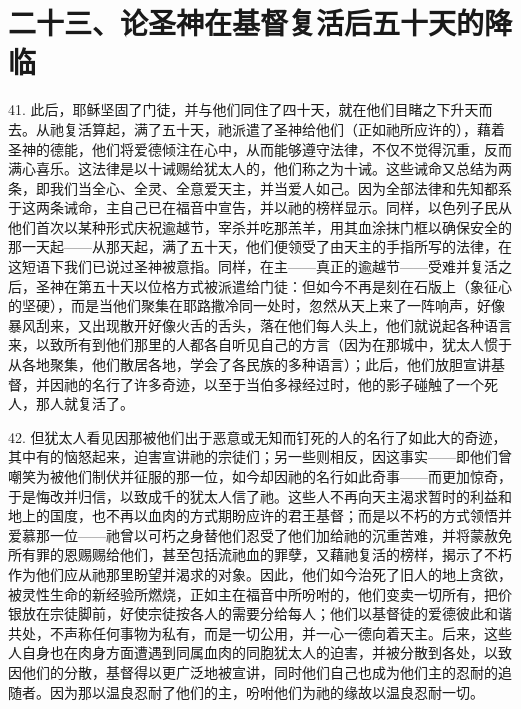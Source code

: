 
\section{二十三、论圣神在基督复活后五十天的降临}

41. 此后，耶稣坚固了门徒，并与他们同住了四十天，就在他们目睹之下升天而去。从祂复活算起，满了五十天，祂派遣了圣神给他们（正如祂所应许的），藉着圣神的德能，他们将爱德倾注在心中，从而能够遵守法律，不仅不觉得沉重，反而满心喜乐。这法律是以十诫赐给犹太人的，他们称之为十诫。这些诫命又总结为两条，即我们当全心、全灵、全意爱天主，并当爱人如己。因为全部法律和先知都系于这两条诫命，主自己已在福音中宣告，并以祂的榜样显示。同样，以色列子民从他们首次以某种形式庆祝逾越节，宰杀并吃那羔羊，用其血涂抹门框以确保安全的那一天起——从那天起，满了五十天，他们便领受了由天主的手指所写的法律，在这短语下我们已说过圣神被意指。同样，在主——真正的逾越节——受难并复活之后，圣神在第五十天以位格方式被派遣给门徒：但如今不再是刻在石版上（象征心的坚硬），而是当他们聚集在耶路撒冷同一处时，忽然从天上来了一阵响声，好像暴风刮来，又出现散开好像火舌的舌头，落在他们每人头上，他们就说起各种语言来，以致所有到他们那里的人都各自听见自己的方言（因为在那城中，犹太人惯于从各地聚集，他们散居各地，学会了各民族的多种语言）；此后，他们放胆宣讲基督，并因祂的名行了许多奇迹，以至于当伯多禄经过时，他的影子碰触了一个死人，那人就复活了。\par

42. 但犹太人看见因那被他们出于恶意或无知而钉死的人的名行了如此大的奇迹，其中有的恼怒起来，迫害宣讲祂的宗徒们；另一些则相反，因这事实——即他们曾嘲笑为被他们制伏并征服的那一位，如今却因祂的名行如此奇事——而更加惊奇，于是悔改并归信，以致成千的犹太人信了祂。这些人不再向天主渴求暂时的利益和地上的国度，也不再以血肉的方式期盼应许的君王基督；而是以不朽的方式领悟并爱慕那一位——祂曾以可朽之身替他们忍受了他们加给祂的沉重苦难，并将蒙赦免所有罪的恩赐赐给他们，甚至包括流祂血的罪孽，又藉祂复活的榜样，揭示了不朽作为他们应从祂那里盼望并渴求的对象。因此，他们如今治死了旧人的地上贪欲，被灵性生命的新经验所燃烧，正如主在福音中所吩咐的，他们变卖一切所有，把价银放在宗徒脚前，好使宗徒按各人的需要分给每人；他们以基督徒的爱德彼此和谐共处，不声称任何事物为私有，而是一切公用，并一心一德向着天主。后来，这些人自身也在肉身方面遭遇到同属血肉的同胞犹太人的迫害，并被分散到各处，以致因他们的分散，基督得以更广泛地被宣讲，同时他们自己也成为他们主的忍耐的追随者。因为那以温良忍耐了他们的主，吩咐他们为祂的缘故以温良忍耐一切。\par

